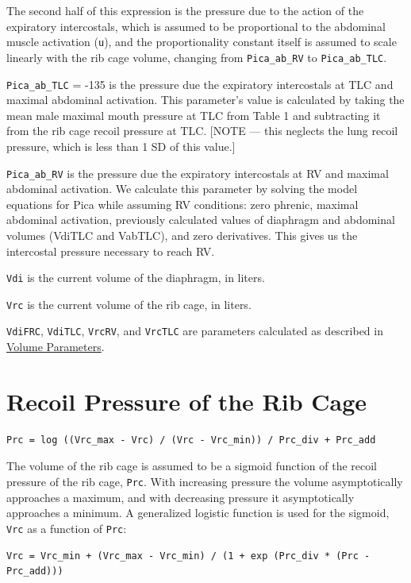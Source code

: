 \documentclass[12pt,openany,oneside]{book}
\begin{document}
The second half of this expression is the pressure due to the action
of the expiratory intercostals, which is assumed to be proportional to
the abdominal muscle activation (\verb~u~), and the proportionality
constant itself is assumed to scale linearly with the rib cage volume,
changing from \verb~Pica_ab_RV~ to \verb~Pica_ab_TLC~.

\verb~Pica_ab_TLC~ = -135 is the pressure due the expiratory
intercostals at TLC and maximal abdominal activation. This
parameter's value is calculated by taking the mean male maximal mouth
pressure at TLC from \citet{Ratnovsky200882} Table 1 and subtracting
it from the rib cage recoil pressure at TLC. [NOTE --- this neglects
the lung recoil pressure, which is less than 1 SD of this value.]

\verb~Pica_ab_RV~ is the pressure due the expiratory intercostals at
RV and maximal abdominal activation. We calculate this parameter by
solving the model equations for Pica while assuming RV conditions:
zero phrenic, maximal abdominal activation, previously calculated
values of diaphragm and abdominal volumes (VdiTLC and VabTLC), and
zero derivatives. This gives us the intercostal pressure necessary to
reach RV.

\verb~Vdi~ is the current volume of the diaphragm, in liters.

\verb~Vrc~ is the current volume of the rib cage, in liters.

\verb~VdiFRC~, \verb~VdiTLC~, \verb~VrcRV~, and \verb~VrcTLC~ are
parameters calculated as described in
\hyperref[Volume Parameters]{Volume Parameters}.

\section{Recoil Pressure of the Rib Cage}
\begin{verbatim}
Prc = log ((Vrc_max - Vrc) / (Vrc - Vrc_min)) / Prc_div + Prc_add
\end{verbatim}

The volume of the rib cage is assumed to be a sigmoid function of the
recoil pressure of the rib cage, \verb~Prc~. With increasing pressure
the volume asymptotically approaches a maximum, and with decreasing
pressure it asymptotically approaches a minimum. A generalized
logistic function is used for the sigmoid, \verb~Vrc~ as a function of
\verb~Prc~:

\begin{verbatim}
Vrc = Vrc_min + (Vrc_max - Vrc_min) / (1 + exp (Prc_div * (Prc - Prc_add))) 
\end{verbatim}
\end{document}
